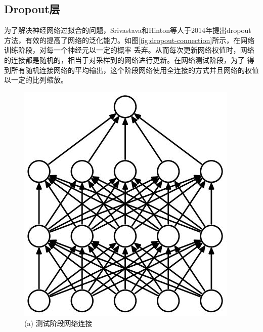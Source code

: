 \subsection{Dropout层}
	为了解决神经网络过拟合的问题，Srivastava和Hinton等人\cite{srivastava2014dropout}于2014年提出dropout
	方法，有效的提高了网络的泛化能力。如图\ref{fig:dropout-connection}所示，在网络训练阶段，对每一个神经元以一定的概率
	丢弃。从而每次更新网络权值时，网络的连接都是随机的，相当于对采样到的网络进行更新。在网络测试阶段，为了
	得到所有随机连接网络的平均输出，这个阶段网络使用全连接的方式并且网络的权值以一定的比列缩放。
	\begin{figure}[!htp]    
\begin{minipage}[t]{0.5\linewidth}%
	\centering    
	\includegraphics[width=0.9\linewidth]{figure/chap4/no-dropout.jpg}    
	\caption*{(a) 测试阶段网络连接 }
	\label{fig:no-dropout}    
\end{minipage}    
\begin{minipage}[t]{0.5\linewidth}%
	\centering    

\end{minipage}
\end{figure}
